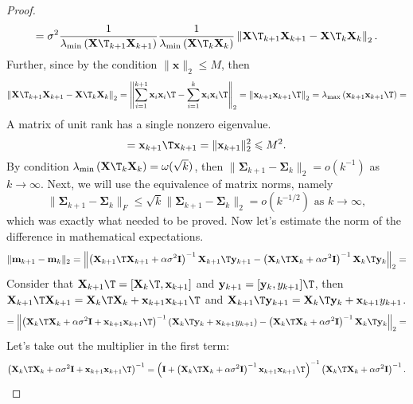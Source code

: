 \documentclass[runningheads]{llncs}
\begin{document}
\begin{proof}
    \[ = \sigma^2  \dfrac{1}{\lambda_{\min}\left( \mathbf{X}\T_{k+1} \mathbf{X}_{k+1} \right)} \dfrac{1}{\lambda_{\min}\left( \mathbf{X}\T_k \mathbf{X}_k \right)} \left\| \mathbf{X}\T_{k+1} \mathbf{X}_{k+1} - \mathbf{X}\T_k \mathbf{X}_k \right\|_2. \]
Further, since by the condition $\|\mathbf{x}\|_2 \leqslant M$, then
    \[ \left\| \mathbf{X}\T_{k+1} \mathbf{X}_{k+1} - \mathbf{X}\T_k \mathbf{X}_k \right\|_2 = \left\| \sum\limits_{i=1}^{k+1} \mathbf{x}_i \mathbf{x}_i\T - \sum\limits_{i=1}^{k} \mathbf{x}_i \mathbf{x}_i\T \right\|_2 = \left\| \mathbf{x}_{k+1} \mathbf{x}_{k+1}\T \right\|_2 = \lambda_{\max}\left( \mathbf{x}_{k+1} \mathbf{x}_{k+1}\T \right) = \]
    A matrix of unit rank has a single nonzero eigenvalue.
    \[= \mathbf{x}_{k+1}\T \mathbf{x}_{k+1} = \| \mathbf{x}_{k+1}\|_2^2 \leqslant M^2. \]
By condition $\lambda_{\min}\left(\mathbf{X}\T_k\mathbf{X}_k \right) = \omega(\sqrt{k})$, then $\|\mathbf{\Sigma}_{k+1} - \mathbf{\Sigma}_k\|_2 = o(k^{-1})$ as $k\to \infty$. Next, we will use the equivalence of matrix norms, namely
    \[ \|\mathbf{\Sigma}_{k+1} - \mathbf{\Sigma}_k \|_F \leqslant\sqrt{k}\|\mathbf{\Sigma}_{k+1} - \mathbf{\Sigma}_k\|_2 = o(k^{-1/2}) \text{ as } k\to \infty, \]
    which was exactly what needed to be proved. Now let's estimate the norm of the difference in mathematical expectations.
    \[ \| \mathbf{m}_{k+1} - \mathbf{m}_k \|_2 = \left\| \left( \mathbf{X}_{k+1}\T \mathbf{X}_{k+1} + \alpha \sigma^2 \mathbf{I} \right)^{-1} \mathbf{X}_{k+1}\T \mathbf{y}_{k+1} - \left( \mathbf{X}_k\T \mathbf{X}_k + \alpha \sigma^2 \mathbf{I} \right)^{-1} \mathbf{X}_k\T \mathbf{y}_k \right\|_2 = \]
    Consider that $\mathbf{X}_{k+1}\T = [\mathbf{X}_k\T,\mathbf{x}_{k+1}]$ and $\mathbf{y}_{k+1} = [\mathbf{y}_k, y_{k+1}]\T$, then $\mathbf{X}_{k+1}\T\mathbf{X}_{k+1} = \mathbf{X}_k\T \mathbf{X}_k +\mathbf{x}_{k+1} \mathbf{x}_{k+1}\T$ and $\mathbf{X}_{k+1}\T\mathbf{y}_{k+1} = \mathbf{X}_k\T \mathbf{y}_k + \mathbf{x}_{k+1} y_{k+1}$.
    \[ = \left\| \left( \mathbf{X}_k\T \mathbf{X}_k + \alpha \sigma^2 \mathbf{I} + \mathbf{x}_{k+1} \mathbf{x}_{k+1}\T \right)^{-1} \left( \mathbf{X}_k\T \mathbf{y}_k + \mathbf{x}_{k+1} y_{k+1} \right) - \left( \mathbf{X}_k\T \mathbf{X}_k + \alpha \sigma^2 \mathbf{I} \right)^{-1} \mathbf{X}_k\T \mathbf{y}_k \right\|_2 = \]
    Let's take out the multiplier in the first term:
\[\left(\mathbf{X}_k\T \mathbf{X}_k+ \alpha\sigma^2 \mathbf{I} +\mathbf{x}_{k+1}\mathbf{x}_{k+1}\T\right)^{-1}= \left(\mathbf{I} + \left( \mathbf{X}_k\T\mathbf{X}_k +\alpha \sigma^2 \mathbf{I}\right)^{-1}\mathbf{x}_{k+1}\mathbf{x}_{k+1}\T\right)^{-1} \left(\mathbf{X}_k\T \mathbf{X}_k + \alpha \sigma^2 \mathbf{I}\right)^{-1}.\]

\end{proof}
\end{document}
